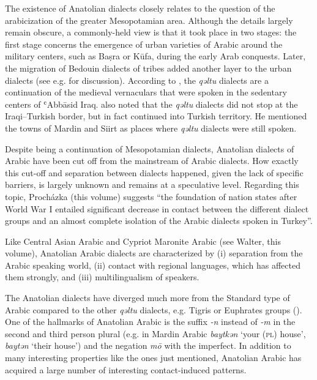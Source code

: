 \documentclass[output=paper]{langsci/langscibook}
\begin{document}
The existence of Anatolian dialects closely relates to the question of the arabicization of the greater Mesopotamian area. Although the details largely remain obscure, a commonly-held view is that it took place in two stages: the first stage concerns the emergence of urban varieties of Arabic around the military centers, such as Ba\d{s}ra or K\={u}fa, during the early Arab conquests. Later, the migration of Bedouin dialects of tribes added another layer to the urban dialects (see e.g. \citealt{Blanc1964,Versteegh1997,Jastrow2006} for discussion). According to \cite{Blanc1964}, the \textit{qəltu} dialects are a continuation of the medieval vernaculars that were spoken in the sedentary centers of ʿAbb\={a}sid Iraq. \cite{Blanc1964} also noted that the \textit{qəltu} dialects did not stop at the Iraqi--Turkish border, but in fact continued into Turkish territory. He mentioned the towns of Mardin and Siirt as places where \textit{qəltu} dialects were still spoken.

Despite being a continuation of Mesopotamian dialects, Anatolian dialects of Arabic have been cut off from the mainstream of Arabic dialects. How exactly this cut-off and separation between dialects happened, given the lack of specific barriers, is largely unknown and remains at a speculative level. Regarding this topic, Proch\'{a}zka (this volume) suggests ``the foundation of nation states after World War I entailed significant decrease in contact between the different dialect groups and an almost complete isolation of the Arabic dialects spoken in Turkey''.

Like Central Asian Arabic and Cypriot Maronite Arabic (see Walter, this volume), Anatolian Arabic dialects are characterized by (i) separation from the Arabic speaking world, (ii) contact with regional languages, which has affected them strongly, and (iii) multilingualism of speakers. %

The Anatolian dialects have diverged much more from the Standard type of Arabic compared to the other \textit{qəltu} dialects, e.g. Tigris or Euphrates groups (\citealt{Jastrow2011iraq}). One of the hallmarks of Anatolian Arabic is the suffix \textit{-n} instead of \textit{-m} in the second and third person plural (e.g. in Mardin Arabic \textit{baytkən} `your (\textsc{pl}) house', \textit{baytən} `their house') and the negation \textit{m\={o}} with the imperfect. In addition to many interesting properties like the ones just mentioned, Anatolian Arabic has acquired a large number of interesting contact-induced patterns.
\end{document}
